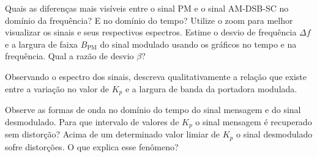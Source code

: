\documentclass[12pt,addpoints]{exam}
\begin{document}
\begin{questions}
    \question Quais as diferenças mais visíveis entre o sinal PM e o sinal AM-DSB-SC no domínio da frequência? E no domínio do tempo? Utilize o zoom para melhor visualizar os sinais e seus respectivos espectros.
    \fillwithlines{1.5in}
    \question Estime o desvio de frequência $\Delta f$ e a largura de faixa $B_{\text{PM}}$ do sinal modulado usando os gráficos no tempo e na frequência. Qual a razão de desvio $\beta$?
    \fillwithlines{0.75in}
    
    \question Observando o espectro dos sinais, descreva qualitativamente a relação que existe entre a variação no valor de $K_{p}$ e a largura de banda da portadora modulada.
    \fillwithlines{1.0in}
     
    \question Observe as formas de onda no domínio do tempo do sinal mensagem e do sinal desmodulado. Para que intervalo de valores de $K_p$ o sinal mensagem é recuperado sem distorção? Acima de um determinado valor limiar de $K_p$ o sinal desmodulado sofre distorções. O que explica esse fenômeno?
    \fillwithlines{1.50in}


    
    
%    
\end{questions}
\end{document}
